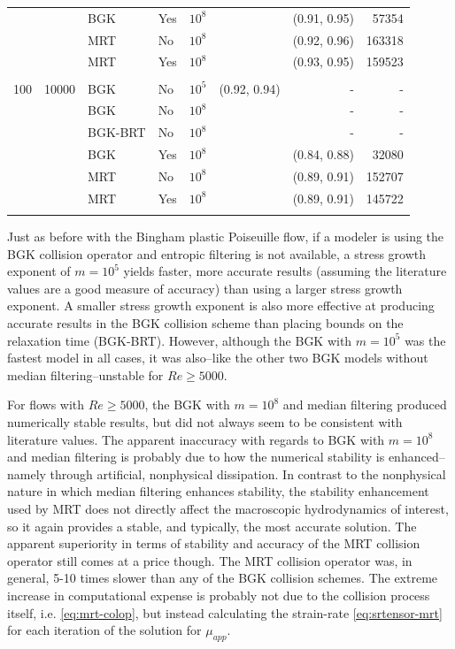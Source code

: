 \documentclass[pdftex,ms]{pittetd}
\begin{document}
\begin{table}
\begin{tabulary}{\linewidth}{r r l l r r r r}
    &      & BGK     & Yes & $10^8$ &              & (0.91, 0.95) & 57354 \\
    &      & MRT     & No  & $10^8$ &              & (0.92, 0.96) & 163318 \\
    &      & MRT     & Yes & $10^8$ &              & (0.93, 0.95) & 159523 \\
\\
100 & 10000 & BGK     & No  & $10^5$ & (0.92, 0.94) & - & - \\
    &       & BGK     & No  & $10^8$ &              & - & - \\
    &       & BGK-BRT & No  & $10^8$ &              & - & - \\
    &       & BGK     & Yes & $10^8$ &              & (0.84, 0.88) & 32080 \\
    &       & MRT     & No  & $10^8$ &              & (0.89, 0.91) & 152707 \\
    &       & MRT     & Yes & $10^8$ &              & (0.89, 0.91) & 145722 \\
\\
\end{tabulary}
\label{tab:lid-bing100}
\end{table}

Just as before with the Bingham plastic Poiseuille flow, if a modeler is using the BGK collision operator and entropic filtering is not available, a stress growth exponent of $m = 10^5$ yields faster, more accurate results (assuming the literature values are a good measure of accuracy) than using a larger stress growth exponent.
A smaller stress growth exponent is also more effective at producing accurate results in the BGK collision scheme than placing bounds on the relaxation time (BGK-BRT).
However, although the BGK with $m = 10^5$ was the fastest model in all cases, it was also--like the other two BGK models without median filtering--unstable for $Re \ge 5000$.

For flows with $Re \ge 5000$, the BGK with $m = 10^8$ and median filtering produced numerically stable results, but did not always seem to be consistent with literature values.
The apparent inaccuracy with regards to BGK with $m = 10^8$ and median filtering is probably due to how the numerical stability is enhanced--namely through artificial, nonphysical dissipation.
In contrast to the nonphysical nature in which median filtering enhances stability, the stability enhancement used by MRT does not directly affect the macroscopic hydrodynamics of interest, so it again provides a stable, and typically, the most accurate solution. %
The apparent superiority in terms of stability and accuracy of the MRT collision operator still comes at a price though.
The MRT collision operator was, in general, 5-10 times slower than any of the BGK collision schemes.
The extreme increase in computational expense is probably not due to the collision process itself, i.e. \eqref{eq:mrt-colop}, but instead calculating the strain-rate \eqref{eq:srtensor-mrt} for each iteration of the solution for $\mu_{app}$.
\end{document}
